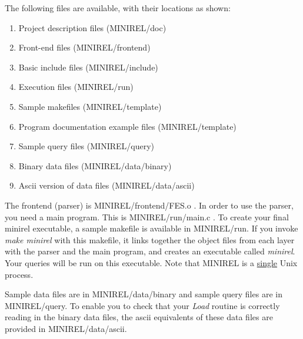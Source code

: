 \noindent
The following files are available, with their locations
as shown:
\begin{enumerate}
\item Project description files \/ (MINIREL/doc)
\item Front-end files \/ (MINIREL/frontend)
\item Basic include files \/ (MINIREL/include)
\item Execution files \/ (MINIREL/run)
\item Sample makefiles \/ (MINIREL/template)
\item Program documentation example files \/ (MINIREL/template)
\item Sample query files \/ (MINIREL/query)
\item Binary data files \/ (MINIREL/data/binary)
\item Ascii version of data files \/ (MINIREL/data/ascii)
\end{enumerate}

\bigskip

\noindent
{}


The frontend (parser) is MINIREL/frontend/FES.o .  In order to use
the parser, you need a main program.  This is MINIREL/run/main.c .
To create your final minirel executable, a sample makefile is
available in MINIREL/run.  If you invoke \emph{make minirel} with
this makefile, it links together the object files from each layer
with the parser and the main program, and creates an executable
called \emph{minirel}. Your queries will be run on this executable.
Note that MINIREL is a \underline{single} Unix process.

Sample data files are in MINIREL/data/binary and sample query files
are in MINIREL/query.  To enable you to check that your \emph{Load}
routine is correctly reading in the binary data files, the ascii
equivalents of these data files are provided in MINIREL/data/ascii.

